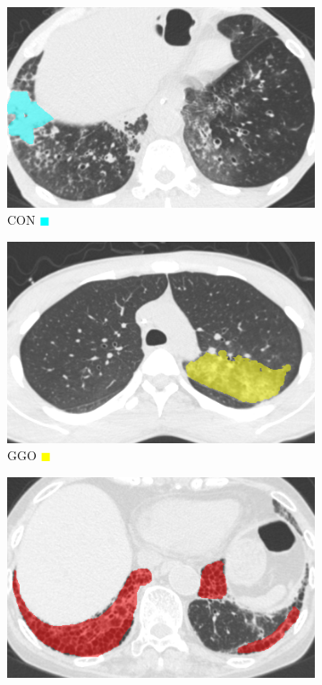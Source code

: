 \begin{figure}[htbp]
  \centering
  \begin{subfigure}{.16\textwidth}
    \includegraphics[width=1\linewidth]{images/examples/consolidation.png}
    \caption{CON \textcolor{cyan}{$\blacksquare$}} \label{fig:example_con}
  \end{subfigure}
  \qquad
  \begin{subfigure}{.16\textwidth}
    \includegraphics[width=1\linewidth]{images/examples/ggo.png}
    \caption{GGO \textcolor{yellow}{$\blacksquare$}}
  \end{subfigure}
  \qquad
  \begin{subfigure}{.16\textwidth}
    \includegraphics[width=1\linewidth]{images/examples/hcm.png}

\end{subfigure}
\end{figure}
